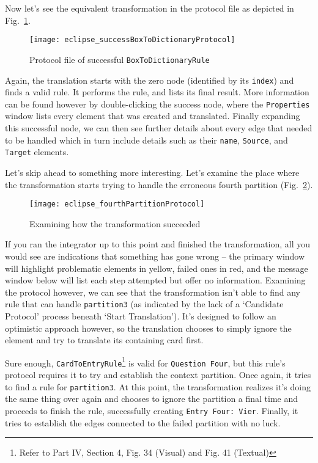 \newpage

Now let's see the equivalent transformation in the protocol file as depicted in Fig.~\ref{eclipse:protocolFWD}.

\vspace{0.5cm}

\begin{figure}[htbp]
\begin{center} 
  \texttt{[image: eclipse\_successBoxToDictionaryProtocol]}
  \caption{Protocol file of successful \texttt{BoxToDictionaryRule}}  
  \label{eclipse:protocolFWD}
\end{center}
\end{figure}

Again, the translation starts with the zero node (identified by its \texttt{index}) and finds a valid rule. It performs the rule, and lists its final result.
More information can be found however by double-clicking the success node, where the \texttt{Properties} window lists every element that was created and
translated. Finally expanding this successful node, we can then see further details about every edge that needed to be handled which in turn include details
such as their \texttt{name}, \texttt{Source}, and \texttt{Target} elements.

Let's skip ahead to something more interesting. Let's examine the place where the transformation starts trying to handle the erroneous fourth partition
(Fig.~\ref{eclipse:fourthPartition}).

\newpage

\begin{figure}[htbp]
\begin{center} 
  \texttt{[image: eclipse\_fourthPartitionProtocol]}
  \caption{Examining how the transformation succeeded}  
  \label{eclipse:fourthPartition}
\end{center}
\end{figure}

If you ran the integrator up to this point and finished the transformation, all you would see are indications that something has gone wrong -- the primary
window will highlight problematic elements in yellow, failed ones in red, and the message window below will list each step attempted but offer no
information. Examining the protocol however, we can see that the transformation isn't able to find any rule that can handle \texttt{partition3} (as indicated by
the lack of a `Candidate Protocol' process beneath `Start Translation'). It's designed to follow an optimistic approach however, so the translation chooses to
simply ignore the element and try to translate its containing card first.

Sure enough, \texttt{CardToEntryRule}\footnote{Refer to Part IV, Section 4, Fig. 34 (Visual) and Fig. 41 (Textual)} is valid for \texttt{Question Four}, but
this rule's protocol requires it to try and establish the context partition. Once again, it tries to find a rule for \texttt{partition3}. At this point, the
transformation realizes it's doing the same thing over again and chooses to ignore the partition a final time and proceeds to finish the rule, successfully
creating \texttt{Entry Four: Vier}. Finally, it tries to establish the edges connected to the failed partition with no luck.
